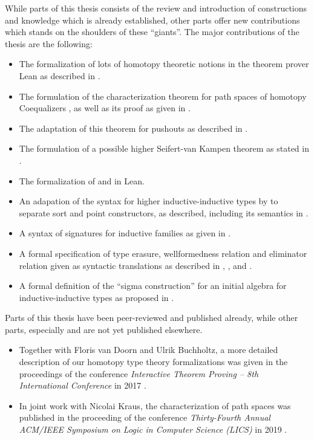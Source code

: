 While parts of this thesis consists of the review and introduction of constructions
and knowledge which is already established,
other parts offer new contributions which stands on the shoulders of these ``giants''.
The major contributions of the thesis are the following:
\begin{itemize}
\item The formalization of lots of homotopy theoretic notions in the theorem prover
Lean as described in .
\item The formulation of the characterization theorem for path spaces
of homotopy Coequalizers , as well as its proof
as given in .
\item The adaptation of this theorem for pushouts as described in .
\item The formulation of a possible higher Seifert-van Kampen theorem
as stated in .
\item The formalization of  and 
in Lean.
\item An adapation of the syntax for higher inductive-inductive types by
\citet{ambrussyntax} to separate sort and point constructors, as described, including
its semantics in .
\item A syntax of signatures for inductive families as given in .
\item A formal specification of type erasure, wellformedness relation and eliminator
relation given as syntactic translations as described in ,
, and .
\item A formal definition of the ``sigma construction'' for an initial algebra
for inductive-inductive types as proposed in .
\end{itemize}

Parts of this thesis have been peer-reviewed and published already, while
other parts, especially  and  are not yet published
elsewhere.
\begin{itemize}
\item Together with Floris van Doorn and Ulrik Buchholtz, a more
detailed description of our homotopy type theory formalizations was given
in the proceedings of the conference \emph{Interactive Theorem Proving -- 8th International Conference}
in 2017 \citep{leanhott}.
\item In joint work with Nicolai Kraus, the characterization of path spaces
was published in the proceeding of the conference
\emph{Thirty-Fourth Annual ACM/IEEE Symposium on
Logic in Computer Science (LICS)} in 2019 \citep{paths}.
\end{itemize}

